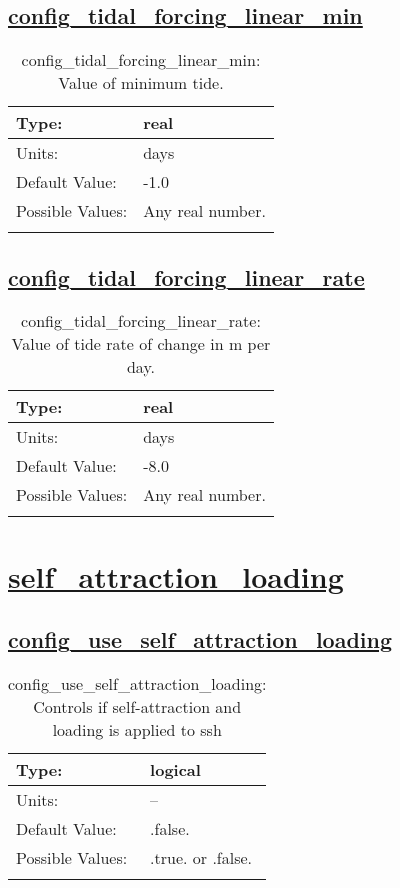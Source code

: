 \subsection[config\_tidal\_forcing\_linear\_min]{\hyperref[sec:nm_tab_tidal_forcing]{config\_tidal\_forcing\_linear\_min}}
\label{subsec:nm_sec_config_tidal_forcing_linear_min}
\begin{center}
\begin{longtable}{| p{2.0in} || p{4.0in} |}
    \hline
    Type: & real \\
    \hline
    Units: & \si{days} \\
    \hline
    Default Value: & -1.0 \\
    \hline
    Possible Values: & Any real number. \\
    \hline
    \caption{config\_tidal\_forcing\_linear\_min: Value of minimum tide.}
\end{longtable}
\end{center}
\subsection[config\_tidal\_forcing\_linear\_rate]{\hyperref[sec:nm_tab_tidal_forcing]{config\_tidal\_forcing\_linear\_rate}}
\label{subsec:nm_sec_config_tidal_forcing_linear_rate}
\begin{center}
\begin{longtable}{| p{2.0in} || p{4.0in} |}
    \hline
    Type: & real \\
    \hline
    Units: & \si{days} \\
    \hline
    Default Value: & -8.0 \\
    \hline
    Possible Values: & Any real number. \\
    \hline
    \caption{config\_tidal\_forcing\_linear\_rate: Value of tide rate of change in m per day.}
\end{longtable}
\end{center}
\section[self\_attraction\_loading]{\hyperref[sec:nm_tab_self_attraction_loading]{self\_attraction\_loading}}
\label{sec:nm_sec_self_attraction_loading}
\subsection[config\_use\_self\_attraction\_loading]{\hyperref[sec:nm_tab_self_attraction_loading]{config\_use\_self\_attraction\_loading}}
\label{subsec:nm_sec_config_use_self_attraction_loading}
\begin{center}
\begin{longtable}{| p{2.0in} || p{4.0in} |}
    \hline
    Type: & logical \\
    \hline
    Units: & -- \\
    \hline
    Default Value: & .false. \\
    \hline
    Possible Values: & .true. or .false. \\
    \hline
    \caption{config\_use\_self\_attraction\_loading: Controls if self-attraction and loading is applied to ssh}
\end{longtable}
\end{center}
